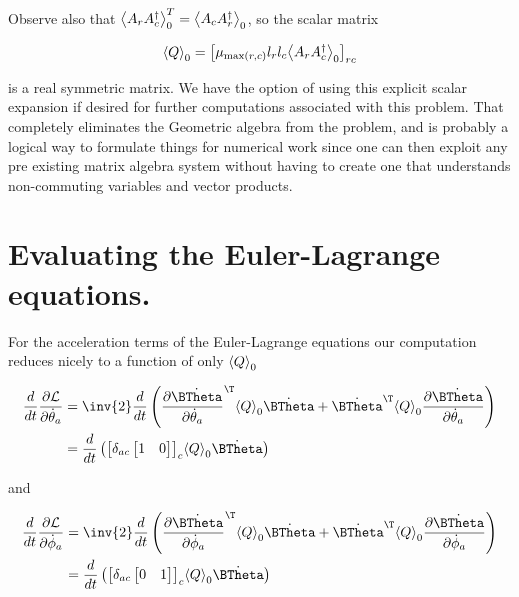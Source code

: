 Observe also that ${\left\langle{{A_r A_c^\dagger}}\right\rangle}_{0}^T = {\left\langle{{A_c A_r^\dagger}}\right\rangle}_{0}$, so the scalar matrix

\begin{align}\label{eqn:multiPendulumSpherical2:boo21}
{\left\langle{{Q}}\right\rangle}_{0} = 
{\begin{bmatrix}
\mu_{\max(r,c)} l_r l_c {\left\langle{{ A_r A_c^\dagger }}\right\rangle}_{0}
\end{bmatrix}}_{rc}
\end{align}

is a real symmetric matrix.  We have the option of using this explicit scalar expansion if desired for further computations associated with this problem.  That completely eliminates the Geometric algebra from the problem, and is probably a logical way to formulate things for numerical work since one can then exploit any pre existing matrix algebra system without having to create one that understands non-commuting variables and vector products.

\section{Evaluating the Euler-Lagrange equations.}

For the acceleration terms of the Euler-Lagrange equations our computation reduces nicely to a function of only ${\left\langle{{Q}}\right\rangle}_{0}$

\begin{align*}
\frac{d}{dt} \PD{\dot{\theta}_a}{\LL}
&=
\inv{2} \frac{d}{dt} 
\left(
\PD{\dot{\theta}_a}{\dot{\BTheta}}^\T
\gpgradezero{Q} 
\dot{\BTheta}
+
\dot{\BTheta}^\T
\gpgradezero{Q} 
\PD{\dot{\theta}_a}{\dot{\BTheta}}
\right)  \\
&=
\frac{d}{dt} \left(
{\begin{bmatrix}
\delta_{ac}
\begin{bmatrix}
1 & 0
\end{bmatrix}
\end{bmatrix}}_c
\gpgradezero{Q} 
\dot{\BTheta}
\right) 
\end{align*}

and

\begin{align*}
\frac{d}{dt} \PD{\dot{\phi}_a}{\LL}
&=
\inv{2} \frac{d}{dt} 
\left(
\PD{\dot{\phi}_a}{\dot{\BTheta}}^\T
\gpgradezero{Q} 
\dot{\BTheta}
+
\dot{\BTheta}^\T
\gpgradezero{Q} 
\PD{\dot{\phi}_a}{\dot{\BTheta}}
\right)  \\
&=
\frac{d}{dt} \left(
{\begin{bmatrix}
\delta_{ac}
\begin{bmatrix}
0 & 1
\end{bmatrix}
\end{bmatrix}}_c
\gpgradezero{Q} 
\dot{\BTheta}
\right) 
\end{align*}

